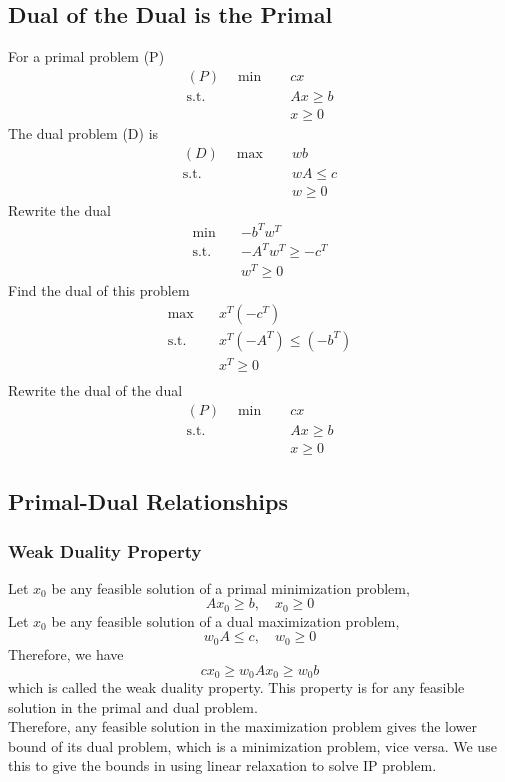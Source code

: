 			\subsection{Dual of the Dual is the Primal}
				For a primal problem (P)
				\begin{align}
					(P) \quad \min \quad & cx \\
							\text{s.t.} \quad & Ax \ge b \\
											  & x \ge 0 
				\end{align}
				The dual problem (D) is 
				\begin{align}
					(D) \quad \max \quad & wb \\
							\text{s.t.} \quad & wA \le c \\
											  & w \ge 0 
				\end{align}
				Rewrite the dual
				\begin{align}
					\min \quad & -b^Tw^T \\
					\text{s.t.} \quad & -A^Tw^T \ge -c^T \\
									  & w^T \ge 0 
				\end{align}
				Find the dual of this problem
				\begin{align}
					\max \quad & x^T(-c^T)\\
					\text{s.t.} \quad & x^T(-A^T) \le (-b^T) \\
									  & x^T \ge 0 \\
				\end{align}
				Rewrite the dual of the dual
				\begin{align}
					(P) \quad \min \quad & cx \\
							\text{s.t.} \quad & Ax \ge b \\
											  & x \ge 0 
				\end{align}

			\subsection{Primal-Dual Relationships}
				\subsubsection{Weak Duality Property}
					Let $x_0$ be any feasible solution of a primal minimization problem,
					\begin{equation}
						Ax_0 \ge b, \quad x_0\ge 0 
					\end{equation}
					Let $x_0$ be any feasible solution of a dual maximization problem,
					\begin{equation}
						w_0A \le c, \quad w_0\ge 0 
					\end{equation}
					Therefore, we have
					\begin{equation}
						cx_0 \ge w_0Ax_0 \ge w_0b 
					\end{equation}
					which is called the weak duality property. This property is for any feasible solution in the primal and dual problem.\\
					Therefore, any feasible solution in the maximization problem gives the lower bound of its dual problem, which is a minimization problem, vice versa. We use this to give the bounds in using linear relaxation to solve IP problem.

